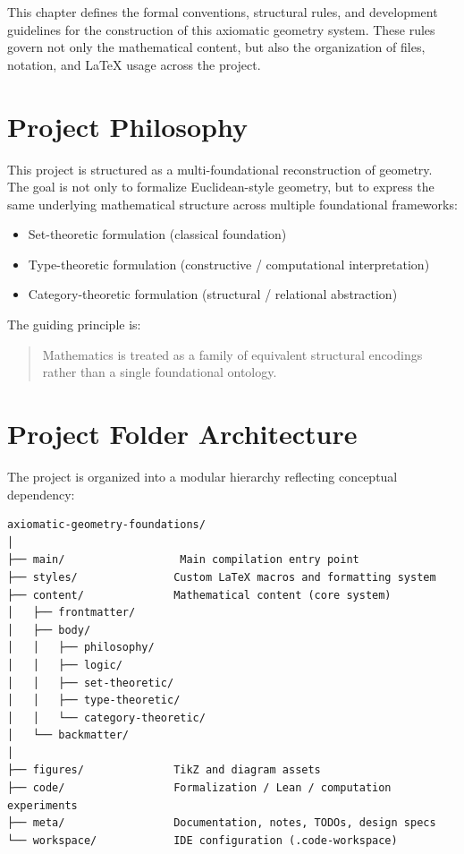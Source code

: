 \documentclass{book}
\begin{document}
This chapter defines the formal conventions, structural rules, and development guidelines for the construction of this axiomatic geometry system. These rules govern not only the mathematical content, but also the organization of files, notation, and LaTeX usage across the project.

\section{Project Philosophy}

This project is structured as a multi-foundational reconstruction of geometry. The goal is not only to formalize Euclidean-style geometry, but to express the same underlying mathematical structure across multiple foundational frameworks:

\begin{itemize}
    \item Set-theoretic formulation (classical foundation)
    \item Type-theoretic formulation (constructive / computational interpretation)
    \item Category-theoretic formulation (structural / relational abstraction)
\end{itemize}

The guiding principle is:

\begin{quote}
Mathematics is treated as a family of equivalent structural encodings rather than a single foundational ontology.
\end{quote}

\section{Project Folder Architecture}

The project is organized into a modular hierarchy reflecting conceptual dependency:

\begin{verbatim}
axiomatic-geometry-foundations/
│
├── main/                  Main compilation entry point
├── styles/               Custom LaTeX macros and formatting system
├── content/              Mathematical content (core system)
│   ├── frontmatter/
│   ├── body/
│   │   ├── philosophy/
│   │   ├── logic/
│   │   ├── set-theoretic/
│   │   ├── type-theoretic/
│   │   └── category-theoretic/
│   └── backmatter/
│
├── figures/              TikZ and diagram assets
├── code/                 Formalization / Lean / computation experiments
├── meta/                 Documentation, notes, TODOs, design specs
└── workspace/            IDE configuration (.code-workspace)
\end{verbatim}
\end{document}
